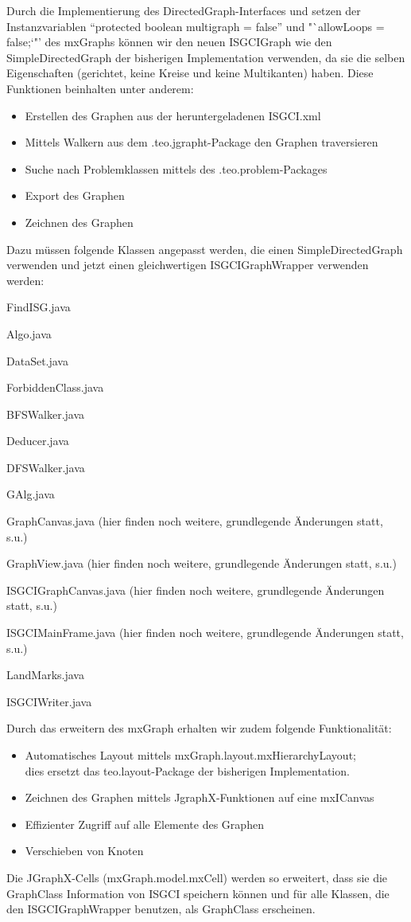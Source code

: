 \documentclass[10pt,a4paper]{article}
\begin{document}
Durch die Implementierung des DirectedGraph-Interfaces und setzen der Instanzvariablen "`protected boolean multigraph = false"' und "`allowLoops = false;`"' des mxGraphs können wir den neuen ISGCIGraph wie den SimpleDirectedGraph der bisherigen Implementation verwenden, da sie die selben Eigenschaften (gerichtet, keine Kreise und keine Multikanten) haben. Diese Funktionen beinhalten unter anderem: \begin{itemize}
\item Erstellen des Graphen aus der heruntergeladenen ISGCI.xml
\item Mittels Walkern aus dem .teo.jgrapht-Package den Graphen traversieren
\item Suche nach Problemklassen mittels des .teo.problem-Packages
\item Export des Graphen
\item Zeichnen des Graphen

\end{itemize}
Dazu müssen folgende Klassen angepasst werden, die einen SimpleDirectedGraph verwenden und jetzt einen gleichwertigen ISGCIGraphWrapper verwenden werden: \begin{description}
\item FindISG.java
\item Algo.java
\item DataSet.java
\item ForbiddenClass.java
\item BFSWalker.java
\item Deducer.java
\item DFSWalker.java
\item GAlg.java
\item GraphCanvas.java (hier finden noch weitere, grundlegende Änderungen statt, s.u.)
\item GraphView.java (hier finden noch weitere, grundlegende Änderungen statt, s.u.)
\item ISGCIGraphCanvas.java (hier finden noch weitere, grundlegende Änderungen statt, s.u.)
\item ISGCIMainFrame.java (hier finden noch weitere, grundlegende Änderungen statt, s.u.)
\item LandMarks.java
\item ISGCIWriter.java
\end{description}
 Durch das erweitern des mxGraph erhalten wir zudem folgende Funktionalität: 
 \begin{itemize}
 \item Automatisches Layout mittels mxGraph.layout.mxHierarchyLayout; \\dies ersetzt das teo.layout-Package der bisherigen Implementation.
 \item Zeichnen des Graphen mittels JgraphX-Funktionen auf eine mxICanvas
 \item Effizienter Zugriff auf alle Elemente des Graphen
 \item Verschieben von Knoten
 \end{itemize}
Die JGraphX-Cells (mxGraph.model.mxCell) werden so erweitert, dass sie die GraphClass Information von ISGCI speichern können und für alle Klassen, die den ISGCIGraphWrapper benutzen, als GraphClass erscheinen.
\end{document}

